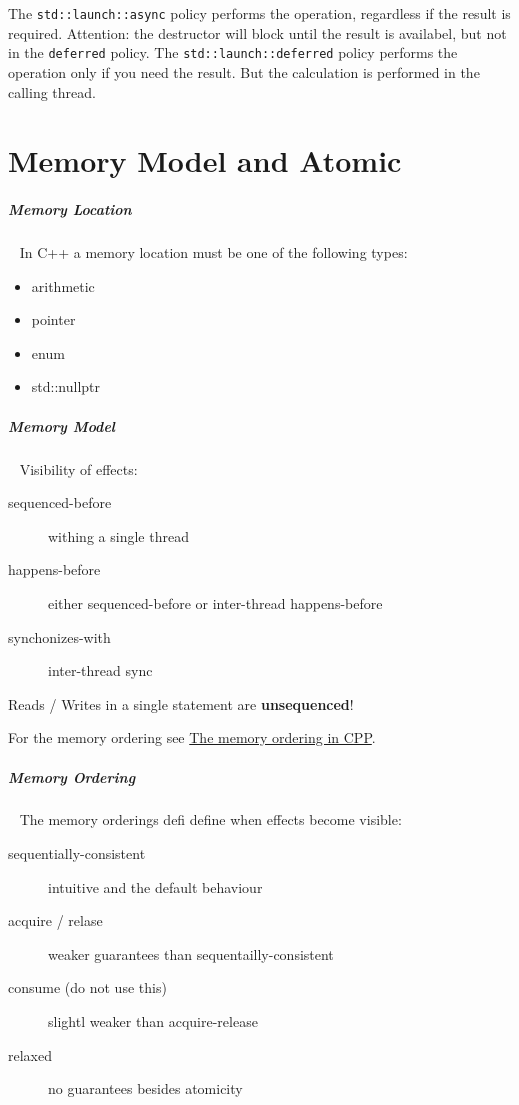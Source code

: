 \documentclass[11pt,twoside,landscape]{article}
\begin{document}
\begin{multicols}{2}
The \texttt{std::launch::async} policy performs the operation, regardless if the result is required.
Attention: the destructor will block until the result is availabel, but not in the \texttt{deferred} policy.
The \texttt{std::launch::deferred} policy performs the operation only if you need the result.
But the calculation is performed in the calling thread.

\section{Memory Model and Atomic}
\label{sec:org6c42d28}
\subparagraph{Memory Location} \
\label{sec:orgd381051}
In C++ a memory location must be one of the following types:
\begin{itemize}
\item arithmetic
\item pointer
\item enum
\item std::nullptr
\end{itemize}

\subparagraph{Memory Model} \
\label{sec:orgfc343a6}
Visibility of effects:
\begin{description}
\item[{sequenced-before}] withing a single thread
\item[{happens-before}] either sequenced-before or inter-thread happens-before
\item[{synchonizes-with}] inter-thread sync
\end{description}


Reads / Writes in a single statement are \textbf{unsequenced}!

For the memory ordering see \href{../../../roam/20230629160255-the_memory_ordering_in_cpp.org}{The memory ordering in CPP}.

\subparagraph{Memory Ordering} \
\label{sec:org094fbc2}
The memory orderings defi define when effects become visible:
\begin{description}
\item[{sequentially-consistent}] intuitive and the default behaviour
\item[{acquire / relase}] weaker guarantees than sequentailly-consistent
\item[{consume (do not use this)}] slightl weaker than acquire-release
\item[{relaxed}] no guarantees besides atomicity
\end{description}


\end{multicols}
\end{document}
